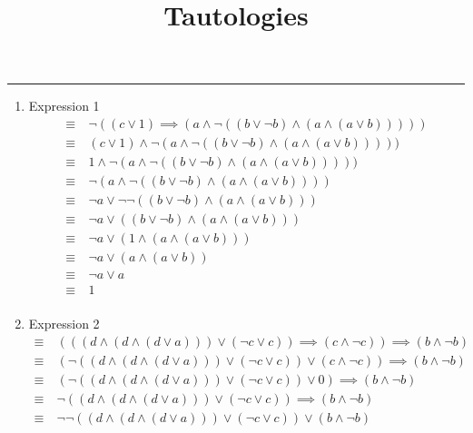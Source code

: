 \documentclass[11pt]{article}
\title{\vspace{-0.6in}Tautologies\vspace{-1.8em}}
\date{}
\begin{document}
\maketitle

\vspace{-0.3in}
\noindent
\rule{\linewidth}{0.4pt}

\begin{enumerate}[wide, labelindent=0pt]
    \item Expression 1 \begin{align*}
        \equiv&~ \neg ((c \vee 1) \implies (a \wedge \neg ((b \vee \neg b) \wedge (a \wedge (a \vee b))))) \\
        \equiv&~ (c \vee 1) \wedge \neg (a \wedge \neg ((b \vee \neg b) \wedge (a \wedge (a \vee b))))) \\
        \equiv&~ 1 \wedge \neg (a \wedge \neg ((b \vee \neg b) \wedge (a \wedge (a \vee b))))) \\
        \equiv&~ \neg (a \wedge \neg ((b \vee \neg b) \wedge (a \wedge (a \vee b)))) \\
        \equiv&~ \neg a \vee \neg \neg ((b \vee \neg b) \wedge (a \wedge (a \vee b))) \\
        \equiv&~ \neg a \vee ((b \vee \neg b) \wedge (a \wedge (a \vee b))) \\
        \equiv&~ \neg a \vee (1 \wedge (a \wedge (a \vee b))) \\
        \equiv&~ \neg a \vee (a \wedge (a \vee b)) \\
        \equiv&~ \neg a \vee a \\
        \equiv&~ 1 \\
    \end{align*}
    \item Expression 2 \begin{align*}
        \equiv&~ (((d \wedge (d \wedge (d \vee a))) \vee (\neg c \vee c)) \implies (c \wedge \neg c)) \implies (b \wedge \neg b) \\
        \equiv&~ (\neg ((d \wedge (d \wedge (d \vee a))) \vee (\neg c \vee c)) \vee (c \wedge \neg c)) \implies (b \wedge \neg b) \\
        \equiv&~ (\neg ((d \wedge (d \wedge (d \vee a))) \vee (\neg c \vee c)) \vee 0) \implies (b \wedge \neg b) \\
        \equiv&~ \neg ((d \wedge (d \wedge (d \vee a))) \vee (\neg c \vee c)) \implies (b \wedge \neg b) \\
        \equiv&~ \neg \neg ((d \wedge (d \wedge (d \vee a))) \vee (\neg c \vee c)) \vee (b \wedge \neg b) \\

\end{align*}
\end{enumerate}
\end{document}
